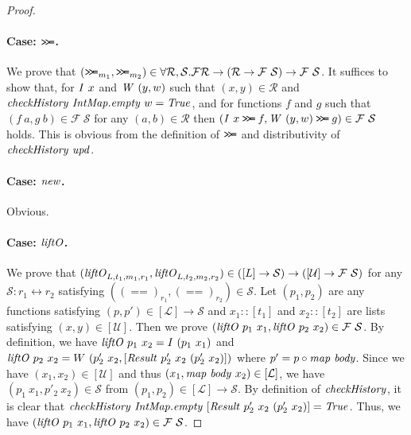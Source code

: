 \documentclass{article}
\theoremstyle{definition}
\newcommand{\BIND}{\mathbin{\texttt{>\!>\!=}}}
\newcommand{\BETWEEN}{\leftrightarrow}
\newcommand{\texteq}{\mathrel{\texttt{==}}}
\begin{document}
\begin{proof}
\paragraph{Case: $\BIND$.}
We prove that $(\BIND_{m_1}, \BIND_{m_2}) 
\in \forall \mathcal{R},\mathcal{S}. \mathcal{F} \mathcal{R} \to (\mathcal{R} \to \mathcal{F}~\mathcal{S}) \to \mathcal{F}~\mathcal{S}$.
It suffices to show that, for $\mathit{I}~x$ and $\mathit{W}~(y,w)$ such that $(x,y) \in \mathcal{R}$ and $\mathit{checkHistory}~\mathit{IntMap.empty}~w = \mathit{True}$, and for functions $f$ and $g$ such that $(f~a,g~b) \in \mathcal{F}~\mathcal{S}$ for any $(a,b) \in \mathcal{R}$ then $(\mi{I}~x \BIND f, \mi{W}~(y,w) \BIND g) \in \mathcal{F}~\mathcal{S}$ holds. This is obvious from the definition of $\BIND$ and distributivity of $\mathit{checkHistory}~\mathit{upd}$.


\paragraph{Case: $\mathit{new}$.} Obvious. 

\paragraph{Case: $\mathit{liftO}$.}
We prove that $(\mathit{liftO}_{L,t_1,m_1,r_1}, \mathit{liftO}_{L,t_2,m_2,r_2}) \in 
([L] \to \mathcal{S}) \to ([\mathcal{U}] \to \mathcal{F}~\mathcal{S})$ for any $\mathcal{S} : r_1 \BETWEEN r_2$ satisfying $((\texteq)_{r_1}, (\texteq)_{r_2}) \in \mathcal{S}$.
Let $(p_1,p_2)$ are any functions satisfying $(p,p') \in [\mathcal{L}] \to \mathcal{S}$ and $x_1 :: [t_1]$ and $x_2 :: [t_2]$ are lists satisfying $(x,y) \in [\mathcal{U}]$. Then we prove $(\mathit{liftO}~p_1~x_1, \mathit{liftO}~p_2~x_2) \in \mathcal{F}~\mathcal{S}$. By definition, we have $\mathit{liftO}~p_1~x_2 = I~(p_1~x_1)$
 and $\mathit{liftO}~p_2~x_2 = W~(p_2'~x_2, [\mathit{Result}~p_2'~x_2~(p_2'~x_2)])$ where 
$p' = p \circ \mathit{map}~\mathit{body}$. Since we have $(x_1,x_2) \in [\mathcal{U}]$ 
and thus $(x_1, \mathit{map}~\mathit{body}~x_2) \in [\mathcal{L}]$, we have $(p_1~x_1,p'_2~x_2) \in \mathcal{S}$ from $(p_1,p_2) \in [\mathcal{L}] \to \mathcal{S}$.
By definition of $\mathit{checkHistory}$, it is clear that $\mathit{checkHistory}~\mathit{IntMap.empty}~[\mathit{Result}~p_2'~x_2~(p_2'~x_2)] = \mathit{True}$.
Thus, we have $(\mathit{liftO}~p_1~x_1, \mathit{liftO}~p_2~x_2) \in \mathcal{F}~\mathcal{S}$.


\end{proof}
\end{document}
